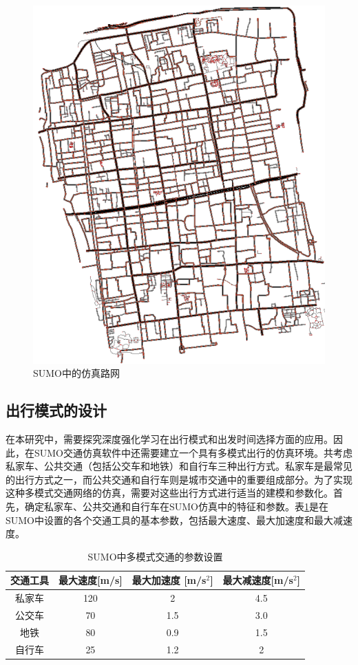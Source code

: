 \begin{figure}[H]
  \centering
  \includegraphics[width=.5\linewidth]{figures/content/suzhousumo.png}
  \caption{SUMO中的仿真路网}
  \label{suzhousumo}
\end{figure}

\subsection{出行模式的设计}

在本研究中，需要探究深度强化学习在出行模式和出发时间选择方面的应用。因此，在SUMO交通仿真软件中还需要建立一个具有多模式出行的仿真环境。共考虑私家车、公共交通（包括公交车和地铁）和自行车三种出行方式。私家车是最常见的出行方式之一，而公共交通和自行车则是城市交通中的重要组成部分。为了实现这种多模式交通网络的仿真，需要对这些出行方式进行适当的建模和参数化。首先，确定私家车、公共交通和自行车在SUMO仿真中的特征和参数。表\ref{mode_inf}是在SUMO中设置的各个交通工具的基本参数，包括最大速度、最大加速度和最大减速度。

\renewcommand{\arraystretch}{1.2} %
\begin{table}[htbp]
\centering
\caption{SUMO中多模式交通的参数设置}
\label{mode_inf}
\begin{tabular}{cccc}
\toprule
交通工具 & 最大速度{[}m/s{]}& 最大加速度 {[}m/s$^2${]}  & 最大减速度{[}m/s$^2${]}   \\
\midrule
私家车          & 120            & 2          &     4.5         \\
公交车           & 70           & 1.5     &   3.0         \\ 
地铁            & 80       & 0.9            &  1.5  \\
自行车             & 25      & 1.2         &  2     \\
\bottomrule
\end{tabular}
\end{table}



